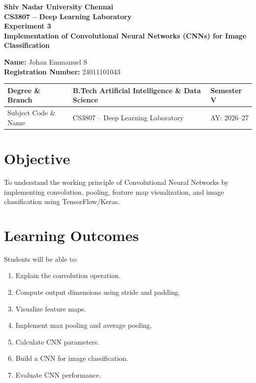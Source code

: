 \documentclass[11pt]{article}
\begin{document}
\begin{center}
{\Large\textbf{Shiv Nadar University Chennai}}\\
\textbf{CS3807 -- Deep Learning Laboratory}\\
\textbf{Experiment 3}\\
{\large\textbf{Implementation of Convolutional Neural Networks (CNNs) for Image Classification}}
\end{center}

\renewcommand{\arraystretch}{1.25}

\begin{flushleft}
\textbf{Name:} Johan Emmanuel S\\
\textbf{Registration Number:} 24011101043\\
\end{flushleft}

\begin{tabular}{|p{3.8cm}|p{8cm}|p{2cm}|}
\hline
Degree \& Branch & B.Tech Artificial Intelligence \& Data Science & Semester V\\ \hline
Subject Code \& Name & CS3807 -- Deep Learning Laboratory & AY: 2026--27\\ \hline
\end{tabular}

\section{Objective}
To understand the working principle of Convolutional Neural Networks by implementing convolution, pooling, feature map visualization, and image classification using TensorFlow/Keras. 

\section{Learning Outcomes}
Students will be able to: 
\begin{enumerate}
    \item Explain the convolution operation. 
    \item Compute output dimensions using stride and padding. 
    \item Visualize feature maps. 
    \item Implement max pooling and average pooling. 
    \item Calculate CNN parameters. 
    \item Build a CNN for image classification. 
    \item Evaluate CNN performance. 
\end{enumerate}
\end{document}
